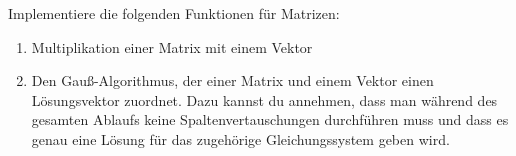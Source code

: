 \begin{aufg}
Implementiere die folgenden Funktionen für Matrizen:
\begin{enumerate}
  \item Multiplikation einer Matrix mit einem Vektor
  \item Den Gauß-Algorithmus, der einer Matrix und einem Vektor einen Lösungsvektor zuordnet. Dazu kannst du annehmen, dass man während des gesamten Ablaufs keine Spaltenvertauschungen durchführen muss und dass es genau eine Lösung für das zugehörige Gleichungssystem geben wird. 
\end{enumerate}
\end{aufg}